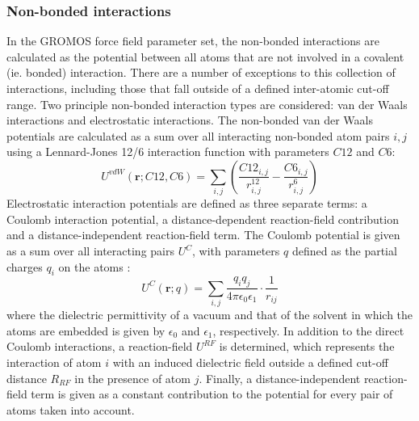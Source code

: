 \subsubsection{Non-bonded interactions}
In the GROMOS force field parameter set, the non-bonded interactions are calculated as the potential between all atoms that are not involved in a covalent (ie. bonded) interaction. There are a number of exceptions to this collection of interactions, including those that fall outside of a defined inter-atomic cut-off range. Two principle non-bonded interaction types are considered: van der Waals interactions and electrostatic interactions. The non-bonded van der Waals potentials are calculated as a sum over all interacting non-bonded atom pairs $i,j$ using a Lennard-Jones 12/6 interaction function with parameters $C12$ and $C6$:
%
%
\begin{equation}
U^{vdW}(\mathbf{r}; C12, C6) = \sum_{i,j} \left( \frac{C12_{i,j}}{r^{12}_{i,j}} - \frac{C6_{i,j}}{r^{6}_{i,j}} \right)
\end{equation}
%
%
Electrostatic interaction potentials are defined as three separate terms: a Coulomb interaction potential, a distance-dependent reaction-field contribution and a distance-independent reaction-field term. The Coulomb potential is given as a sum over all interacting pairs $U^{C}$, with parameters $q$ defined as the partial charges $q_{i}$ on the atoms \cite{Oostenbrink:2004aa}:
%
%
\begin{equation}
U^{C}(\mathbf{r}; q) = \sum_{i,j} \frac{q_{i} q_{j}}{4 \pi \epsilon_{0} \epsilon_{1}} \cdot \frac{1}{r_{ij}}
\end{equation}
%
%
where the dielectric permittivity of a vacuum and that of the solvent in which the atoms are embedded is given by $\epsilon_{0}$ and $\epsilon_{1}$, respectively. In addition to the direct Coulomb interactions, a reaction-field $U^{RF}$ is determined, which represents the interaction of atom $i$ with an induced dielectric field outside a defined cut-off distance $R_{RF}$ in the presence of atom $j$. Finally, a distance-independent reaction-field term is given as a constant contribution to the potential for every pair of atoms taken into account.

\clearpage

